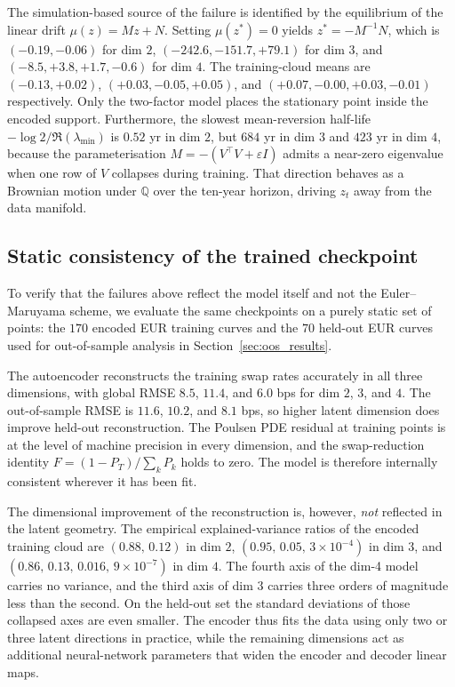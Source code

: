 The simulation-based source of the failure is identified by the
equilibrium of the linear drift $\mu(z)=Mz+N$. Setting
\(\mu(z^\ast)=0\) yields \(z^\ast=-M^{-1}N\), which is
\((-0.19,-0.06)\) for dim $2$, \((-242.6,-151.7,+79.1)\) for dim $3$,
and \((-8.5,+3.8,+1.7,-0.6)\) for dim $4$. The training-cloud means
are \((-0.13,+0.02)\), \((+0.03,-0.05,+0.05)\), and
\((+0.07,-0.00,+0.03,-0.01)\) respectively. Only the two-factor
model places the stationary point inside the encoded support.
Furthermore, the slowest mean-reversion half-life
$-\log 2/\Re(\lambda_{\min})$ is $0.52$ yr in dim $2$, but
$684$ yr in dim $3$ and $423$ yr in dim $4$, because the
parameterisation \(M=-(V^{\!\top}V+\varepsilon I)\) admits a
near-zero eigenvalue when one row of $V$ collapses during training.
That direction behaves as a Brownian motion under $\mathbb Q$ over
the ten-year horizon, driving $z_t$ away from the data manifold.

\subsection{Static consistency of the trained checkpoint}
\label{subsec:static_diagnostics_results}

To verify that the failures above reflect the model itself and not
the Euler--Maruyama scheme, we evaluate the same checkpoints on a
purely static set of points: the $170$ encoded EUR training curves
and the $70$ held-out EUR curves used for out-of-sample analysis in
Section~\ref{sec:oos_results}.

The autoencoder reconstructs the training swap rates accurately in
all three dimensions, with global RMSE $8.5$, $11.4$, and $6.0$ bps
for dim $2$, $3$, and $4$. The out-of-sample RMSE is $11.6$, $10.2$,
and $8.1$ bps, so higher latent dimension does improve held-out
reconstruction. The Poulsen PDE residual at training points is at
the level of machine precision in every dimension, and the
swap-reduction identity
\(F=(1-P_T)/\sum_k P_k\) holds to zero. The model is therefore
internally consistent wherever it has been fit.

The dimensional improvement of the reconstruction is, however,
\emph{not} reflected in the latent geometry. The empirical
explained-variance ratios of the encoded training cloud are
\((0.88,\,0.12)\) in dim $2$,
\((0.95,\,0.05,\,3\!\times\!10^{-4})\) in dim $3$, and
\((0.86,\,0.13,\,0.016,\,9\!\times\!10^{-7})\) in dim $4$. The
fourth axis of the dim-4 model carries no variance, and the third
axis of dim $3$ carries three orders of magnitude less than the
second. On the held-out set the standard deviations of those
collapsed axes are even smaller. The encoder thus fits the data
using only two or three latent directions in practice, while
the remaining dimensions act as additional neural-network parameters
that widen the encoder and decoder linear maps.


